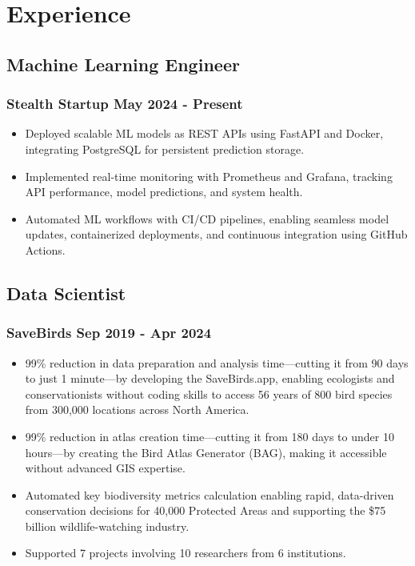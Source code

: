\documentclass[11pt]{article} %
\begin{document}
\section{Experience}
\subsection{Machine Learning Engineer}
\subsubsection{Stealth Startup \hfill May 2024 - Present}
\begin{itemize}
	\item Deployed scalable ML models as REST APIs using FastAPI and Docker, integrating PostgreSQL for persistent prediction storage.
	\item Implemented real-time monitoring with Prometheus and Grafana, tracking API performance, model predictions, and system health. 
	\item Automated ML workflows with CI/CD pipelines, enabling seamless model updates, containerized deployments, and continuous integration using GitHub Actions.
\end{itemize}

\subsection{Data Scientist}
\subsubsection{SaveBirds \hfill Sep 2019 - Apr 2024}
\begin{itemize}
	\item 99\% reduction in data preparation and analysis time—cutting it from 90 days to just 1 minute—by developing the SaveBirds.app, enabling ecologists and conservationists without coding skills to access 56 years of 800 bird species from 300,000 locations across North America.
	\item 99\% reduction in atlas creation time—cutting it from 180 days to under 10 hours—by creating the Bird Atlas Generator (BAG), making it accessible without advanced GIS expertise.
	\item Automated key biodiversity metrics calculation enabling rapid, data-driven conservation decisions for 40,000 Protected Areas and supporting the \$75 billion wildlife-watching industry.
	\item Supported 7 projects involving 10 researchers from 6 institutions.
\end{itemize}
\end{document}
